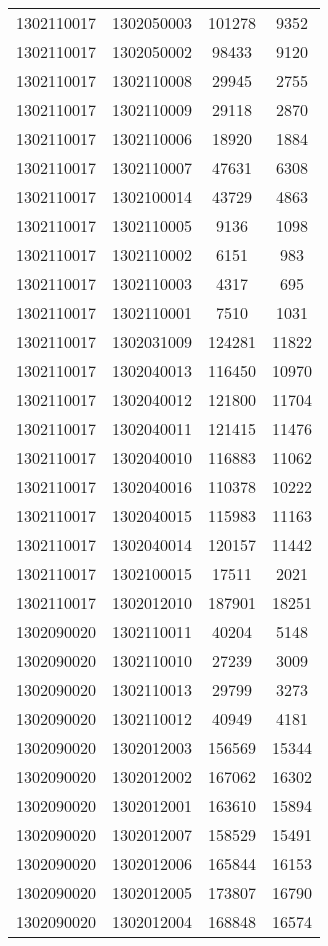 \begin{longtable}[h]{llcc}
		1302110017 & 1302050003 & 101278 & 9352\\
		1302110017 & 1302050002 & 98433 & 9120\\
		1302110017 & 1302110008 & 29945 & 2755\\
		1302110017 & 1302110009 & 29118 & 2870\\
		1302110017 & 1302110006 & 18920 & 1884\\
		1302110017 & 1302110007 & 47631 & 6308\\
		1302110017 & 1302100014 & 43729 & 4863\\
		1302110017 & 1302110005 & 9136 & 1098\\
		1302110017 & 1302110002 & 6151 & 983\\
		1302110017 & 1302110003 & 4317 & 695\\
		1302110017 & 1302110001 & 7510 & 1031\\
		1302110017 & 1302031009 & 124281 & 11822\\
		1302110017 & 1302040013 & 116450 & 10970\\
		1302110017 & 1302040012 & 121800 & 11704\\
		1302110017 & 1302040011 & 121415 & 11476\\
		1302110017 & 1302040010 & 116883 & 11062\\
		1302110017 & 1302040016 & 110378 & 10222\\
		1302110017 & 1302040015 & 115983 & 11163\\
		1302110017 & 1302040014 & 120157 & 11442\\
		1302110017 & 1302100015 & 17511 & 2021\\
		1302110017 & 1302012010 & 187901 & 18251\\
		1302090020 & 1302110011 & 40204 & 5148\\
		1302090020 & 1302110010 & 27239 & 3009\\
		1302090020 & 1302110013 & 29799 & 3273\\
		1302090020 & 1302110012 & 40949 & 4181\\
		1302090020 & 1302012003 & 156569 & 15344\\
		1302090020 & 1302012002 & 167062 & 16302\\
		1302090020 & 1302012001 & 163610 & 15894\\
		1302090020 & 1302012007 & 158529 & 15491\\
		1302090020 & 1302012006 & 165844 & 16153\\
		1302090020 & 1302012005 & 173807 & 16790\\
		1302090020 & 1302012004 & 168848 & 16574\\

\end{longtable}
